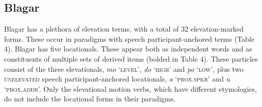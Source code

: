 \documentclass[output=paper]{LSP/langsci}
\begin{document}
 

   

  

\subsection{Blagar}
Blagar has a plethora of elevation terms, with a total of 32 elevation-marked forms. These occur in paradigms with speech participant-anchored terms (Table 4). Blagar has five locationals. These appear both as independent words and as constituents of multiple sets of derived items (bolded in Table 4). These particles consist of the three elevationals, \textit{mo} `\textsc{level',} \textit{do} `\textsc{high'} and \textit{po} `\textsc{low',} plus two \textsc{unelevated} speech participant-anchored locationals, \textit{{\textglotstop}}\textit{a} `\textsc{prox.spkr'} and \textit{{\textglotstop}}\textit{u} `\textsc{prox.addr'.} Only the elevational motion verbs, which have different etymologies, do not include the locational forms in their paradigms. 
\end{document}
